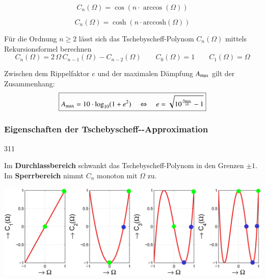 \vspace{0.2cm}

\begin{minipage}[c]{0.48\columnwidth}
    \begin{center}
        $$ \boxed{ C_n(\Omega) = \cos(n \cdot \arccos(\Omega)) } $$
    \end{center}
    
\end{minipage}
\hfill
\begin{minipage}[c]{0.48\columnwidth}
    \begin{center}
        $$ \boxed{ C_n(\Omega) = \cosh(n \cdot \mathrm{arccosh}(\Omega)) } $$
    \end{center}
\end{minipage}

\vspace{0.2cm}
Für die Ordnung $n \geq 2$ lässt sich das Tschebyscheff-Polynom $C_n(\Omega)$ mittels Rekursionsformel berechnen
$$ \boxed{ C_n(\Omega) = 2 \, \Omega \, C_{n-1}(\Omega) - C_{n-2}(\Omega) }  \qquad C_0(\Omega) = 1 \qquad C_1(\Omega) = \Omega $$

Zwischen dem Rippelfaktor $e$ und der maximalen Dämpfung $A_{\rm max}$ gilt der Zusammenhang:
$$ \boxed{ A_{\rm max} = 10 \cdot \log_{10}(1 + e^2) \quad \Leftrightarrow \quad e = \sqrt{10^{\frac{A_{\rm max}}{10}} -1} } $$


\subsubsection{Eigenschaften der Tschebyscheff--Approximation}{311}

Im \textbf{Durchlassbereich} schwankt das Tschebyscheff-Polynom in den Grenzen $\pm 1$. Im \textbf{Sperrbereich} nimmt
$C_n$ monoton mit $\Omega$ zu.

\begin{center}
    \includegraphics[width=0.8\columnwidth]{images/filter_tschebyscheff_ordnung_ablesen.png}
\end{center}


